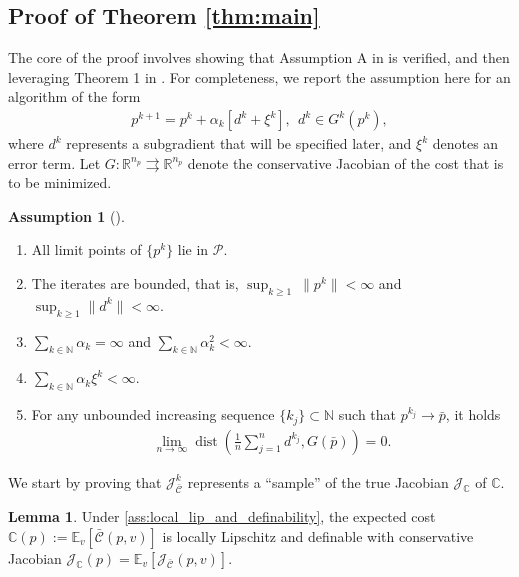 \documentclass[journal,twoside,web,final]{ieeecolor}
\theoremstyle{definition}
\newtheorem{assumption}{Assumption}
\newtheorem{lemma}{Lemma}
\newcommand{\R}{\mathbb{R}}
\newcommand{\N}{\mathbb{N}}
\newcommand{\J}{\mathcal{J}}
\newcommand{\E}{\mathbb{E}}
\newcommand{\C}{\mathbb{C}}
\newcommand{\Cb}{{\bar{\mathcal{C}}}}
\begin{document}
\subsection{Proof of Theorem \ref{thm:main}}
\label{section:convergence_proof}
The core of the proof involves showing that Assumption A in \cite{davis2020stochastic} is verified,
and then leveraging Theorem 1 in \cite{davis2020stochastic}.
For completeness, we report the assumption here for an algorithm of the form
\begin{align*}
p^{k+1} = p^k + \alpha_k[d^k+\xi^k],~~ d^k\in G^k(p^k),
\end{align*}
where $d^k$ represents a subgradient that will be specified later,
and $\xi^k$ denotes an error term.
Let $G:\R^{n_p} \rightrightarrows \R^{n_p}$ denote the conservative Jacobian of the cost that is to be minimized.
%
\begin{assumption}[]\label{ass:davis} \hspace{1sp}
\begin{enumerate}
    \item All limit points of $\{p^k\}$ lie in $\mathcal{P}$.
    \item The iterates are bounded, that is, $\sup_{k \geq 1}~\|p^k\|< \infty$ and $\sup_{k \geq 1}\|d^k\|< \infty$.
    \item $\sum_{k\in\N} \alpha_k = \infty$ and $\sum_{k\in\N} \alpha_k^2 < \infty$.
    \item $\sum_{k\in\N} \alpha_k \xi^k < \infty$.
    \item For any unbounded increasing sequence $\{ k_j \} \subset \N$ such that $p^{k_j}\to \bar{p}$, it holds
    \begin{align*}
    \lim_{n\to \infty} \operatorname*{dist} \left( \frac{1}{n} \sum_{j=1}^{n} d^{k_j},G(\bar{p}) \right) = 0.
    \end{align*}
\end{enumerate}
\end{assumption}
%
We start by proving that $\J_{\bar{\mathcal{C}}}^k$ represents a ``sample'' of the true Jacobian $\J_\C$ of $\C$.
%
\begin{lemma}\label{lemma:exchange_diff_and_exp}
Under \cref{ass:local_lip_and_definability}, the expected cost $\C(p):=\E_v[\Cb(p,v)]$ is locally Lipschitz and definable with conservative Jacobian $\J_\C(p)=\E_v[\J_\Cb(p,v)]$.
\end{lemma}
\end{document}
